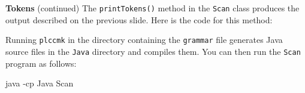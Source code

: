 \begin{minipage}[t]{\sw}
\slidenumber
\LARGE
{\bf Tokens} (continued)\exx
The \verb'printTokens()' method in the \verb'Scan' class
produces the output described on the previous slide.
Here is the code for this method:
{\Large
{}
}
Running \verb'plccmk'
in the directory containing the \verb'grammar' file
generates Java source files
in the \verb'Java' directory and compiles them.
You can then run the \verb'Scan' program as follows:
\begin{qv}
java -cp Java Scan
\end{qv}
\end{minipage}
\clearpage
